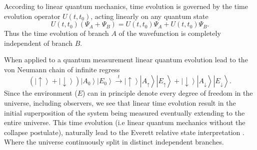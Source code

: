 \documentclass[showpacs,preprintnumbers,amsmath,amssymb,12pt]{revtex4-2}
\begin{document}
According to linear quantum mechanics, time evolution is governed by
the time evolution operator $U(t,t_0)$, acting linearly on any quantum
state
\begin{equation}
\label{eq:U}
U(t,t_0)(\Psi_A+\Psi_B)=U(t,t_0)\Psi_A+U(t,t_0)\Psi_B.
\end{equation}
Thus the time evolution of branch $A$ of the wavefunction is
completely independent of branch $B$.

When applied to a quantum measurement linear quantum evolution lead to
the von Neumann chain of infinite regress \cite{neumann}
\begin{equation}
  \left(\left| \uparrow \right \rangle+\left|\downarrow \right\rangle\right)
  \left|A_{0}\right\rangle\left|E_0\right\rangle 
  \stackrel{t}{\rightarrow} 
  \left|\uparrow \right \rangle\left|A_{\uparrow}\right\rangle
  \left|E_{\uparrow}\right\rangle+\left|\downarrow \right\rangle
  \left|A_{\downarrow}\right\rangle\left|E_{\downarrow}\right\rangle.
\label{eq:linevolution}
\end{equation}
Since the environment ($E$) can in principle denote every degree of
freedom in the universe, including observers, we see that linear time
evolution result in the initial superposition of the system being
measured eventually extending to the entire universe.  This time
evolution (i.e linear quantum mechanics without the collapse
postulate), naturally lead to the Everett relative state
interpretation \cite{everett}. Where the universe continuously split
in distinct independent branches.


%
\end{document}
